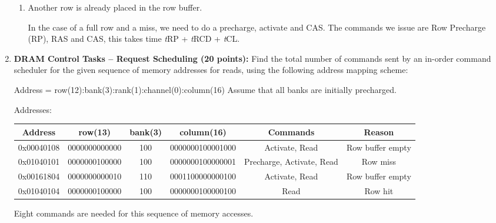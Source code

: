 \documentclass[a4paper, 11pt]{exam}
\begin{document}
\begin{enumerate}
\begin{enumerate}
 \item  Another row is already placed in the row buffer.

In the case of a full row and a miss, we need to do a precharge, activate and
CAS. The commands we issue are Row Precharge (RP), RAS and CAS, this takes time
{\it t}RP + {\it t}RCD + {\it t}CL.
 \end{enumerate}

\item \textbf {DRAM Control Tasks – Request Scheduling (20 points): }  Find the total number of commands sent by an in-order command scheduler for the given sequence of memory addresses for reads, using the following address mapping scheme:

\hspace{20pt} Address = row(12):bank(3):rank(1):channel(0):column(16)\newline
\hspace{20pt} Assume that all banks are initially precharged.

\center Addresses: \newline
\begin{table}[H]
\small
\begin{center}
\begin{tabular}{|c|c|c|c|c|c|}
\hline
Address & row(13) & bank(3) & column(16) & Commands & Reason\\
\hline
0x00040108 & 0000000000000 & 100 & 0000000100001000 & Activate, Read & Row buffer empty\\
\hline
0x01040101 & 0000000100000 & 100 & 0000000100000001 & Precharge, Activate, Read & Row miss\\
\hline
0x00161804 & 0000000000010 & 110 & 0001100000000100 & Activate, Read & Row buffer empty\\
\hline
0x01040104 & 0000000100000 & 100 & 0000000100000100 & Read & Row hit\\
\hline
\end{tabular}
\end{center}
\end{table}%
Eight commands are needed for this sequence of memory accesses.
\end{enumerate}
\end{document}
